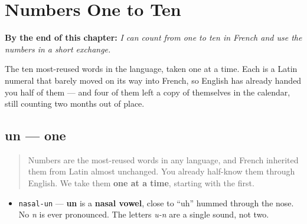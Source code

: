 
\chapter{Numbers One to Ten}
\label{ch:numbers-1-10}

\begin{chapteropening}
\textbf{By the end of this chapter:} \emph{I can count from one to ten in French and use the numbers in a short exchange.}

The ten most-reused words in the language, taken one at a time. Each is a Latin numeral that barely moved on its way into French, so English has already handed you half of them — and four of them left a copy of themselves in the calendar, still counting two months out of place.
\end{chapteropening}

\section[un]{un — one}

\label{lesson:FR-C06-un}



\begin{quote}
Numbers are the most-reused words in any language, and French inherited them from Latin almost unchanged. You already half-know them through English. We take them \textbf{one at a time}, starting with the first.
\end{quote}

\begin{sounds}
\begin{itemize}
\raggedright
  \item \texttt{nasal-un} — \textbf{un} is a \textbf{nasal vowel}, close to \textquotedblleft{}uh\textquotedblright{} hummed through the nose. No \emph{n} is ever pronounced. The letters \emph{u-n} are a single sound, not two.
\end{itemize}
\end{sounds}

